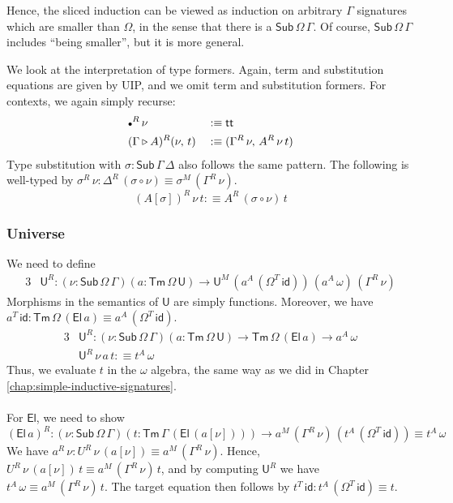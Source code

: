 \documentclass[12pt,a4paper,twoside,openany]{book}
\theoremstyle{remark}
\theoremstyle{definition}
\theoremstyle{theorem}
\newcommand{\id}{\mathsf{id}}
\newcommand{\Sub}{\mathsf{Sub}}
\newcommand{\Tm}{\mathsf{Tm}}
\newcommand{\U}{\mathsf{U}}
\newcommand{\El}{\mathsf{El}}
\renewcommand{\tt}{\mathsf{tt}}
\newcommand{\ext}{\triangleright}
\newcommand{\emptycon}{\scaleobj{.75}\bullet}
\newcommand{\defn}{:\equiv}
\begin{document}
Hence, the sliced induction can be viewed as induction on arbitrary $\Gamma$
signatures which are smaller than $\Omega$, in the sense that there is a
$\Sub\,\Omega\,\Gamma$. Of course, $\Sub\,\Omega\,\Gamma$ includes ``being
smaller'', but it is more general.

We look at the interpretation of type formers. Again, term and substitution
equations are given by UIP, and we omit term and substitution formers.  For
contexts, we again simply recurse:
\begin{alignat*}{3}
  &\emptycon^R\,\nu           &&\defn \tt\\
  &(\Gamma \ext A)^R(\nu,\,t) &&\defn (\Gamma^R\,\nu,\,A^R\,\nu\,t)
\end{alignat*}
Type substitution with $\sigma : \Sub\,\Gamma\,\Delta$ also follows the same
pattern. The following is well-typed by $\sigma^R\,\nu :
\Delta^R\,(\sigma\circ\nu) \equiv \sigma^M\,(\Gamma^R\,\nu)$.
\[ (A[\sigma])^R\,\nu\,t \defn A^R\,(\sigma\circ\nu)\,t \]

\subsubsection{Universe}
We need to define
\begin{alignat*}{3}
  &\U^R : (\nu : \Sub\,\Omega\,\Gamma)(a : \Tm\,\Omega\,\U) \to \U^M\,(a^A\,(\Omega^T\,\id))\,(a^A\,\omega)\,(\Gamma^R\,\nu)
\end{alignat*}
Morphisms in the semantics of $\U$ are simply functions. Moreover, we have
$a^T\,\id : \Tm\,\Omega\,(\El\,a) \equiv a^A\,(\Omega^T\,\id)$.
\begin{alignat*}{3}
  &\U^R : (\nu : \Sub\,\Omega\,\Gamma)(a : \Tm\,\Omega\,\U) \to \Tm\,\Omega\,(\El\,a) \to a^A\,\omega\\
  &\U^R\,\nu\,a\,t \defn t^A\,\omega
\end{alignat*}
Thus, we evaluate $t$ in the $\omega$ algebra, the same way as we did in Chapter
\ref{chap:simple-inductive-signatures}.
\\\\
\noindent For $\El$, we need to show
\[
  (\El\,a)^R : (\nu : \Sub\,\Omega\,\Gamma)(t : \Tm\,\Gamma\,(\El\,(a[\nu]))) \to a^M\,(\Gamma^R\,\nu)\,(t^A\,(\Omega^T\,\id)) \equiv t^A\,\omega
\]
We have $a^R\,\nu : U^R\,\nu\,(a[\nu]) \equiv a^M\,(\Gamma^R\,\nu)$. Hence,
$U^R\,\nu\,(a[\nu])\,t \equiv a^M\,(\Gamma^R\,\nu)\,t$, and by computing $\U^R$
we have $t^A\,\omega \equiv a^M\,(\Gamma^R\,\nu)\,t$. The target equation then
follows by $t^T\,\id : t^A\,(\Omega^T\,\id) \equiv t$.
\end{document}
